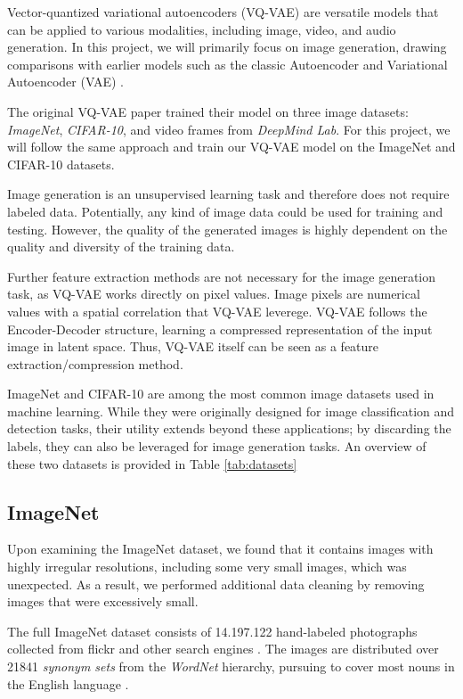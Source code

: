 Vector-quantized variational autoencoders (VQ-VAE) are versatile models that can be applied to various modalities, including image, video, and audio generation. In this project, we will primarily focus on image generation, drawing comparisons with earlier models such as the classic Autoencoder and Variational Autoencoder (VAE) \cite{vae}.

    The original VQ-VAE paper \cite{vqvae} trained their model on three image datasets: \textit{ImageNet}, \textit{CIFAR-10}, and video frames from \textit{DeepMind Lab}. For this project, we will follow the same approach and train our VQ-VAE model on the ImageNet and CIFAR-10 datasets.

    Image generation is an unsupervised learning task and therefore does not require labeled data. Potentially, any kind of image data could be used for training and testing. However, the quality of the generated images is highly dependent on the quality and diversity of the training data.

    Further feature extraction methods are not necessary for the image generation task, as VQ-VAE works directly on pixel values. Image pixels are numerical values with a spatial correlation that VQ-VAE leverege. VQ-VAE follows the Encoder-Decoder structure, learning a compressed representation of the input image in latent space. Thus, VQ-VAE itself can be seen as a feature extraction/compression method.

    ImageNet and CIFAR-10 are among the most common image datasets used in machine learning. While they were originally designed for image classification and detection tasks, their utility extends beyond these applications; by discarding the labels, they can also be leveraged for image generation tasks. An overview of these two datasets is provided in Table \ref{tab:datasets}

    \subsection{ImageNet}
    Upon examining the ImageNet dataset, we found that it contains images with highly irregular resolutions, including some very small images, which was unexpected.
As a result, we performed additional data cleaning by removing images that were excessively small.

    The full ImageNet dataset consists of 14.197.122 hand-labeled photographs collected from flickr and other search engines \cite{ILSVRC15}\cite{imagenet_breakdown}. The images are distributed over 21841 \textit{synonym sets} from the \textit{WordNet} \cite{wordnet} hierarchy, pursuing to cover most nouns in the English language \cite{imagenet_breakdown}.

